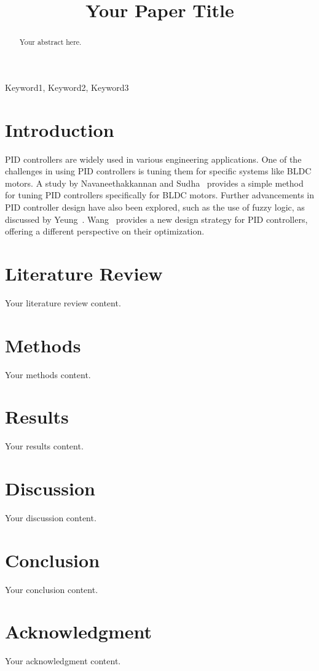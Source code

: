 \documentclass[conference]{IEEEtran}
\begin{document}
\title{Your Paper Title}

\author{
\and
{}
}

\maketitle

\begin{abstract}
Your abstract here.
\end{abstract}

\begin{IEEEkeywords}
Keyword1, Keyword2, Keyword3
\end{IEEEkeywords}

\section{Introduction}
PID controllers are widely used in various engineering applications. One of the challenges in using PID controllers is tuning them for specific systems like BLDC motors. A study by Navaneethakkannan and Sudha~\cite{navaneethakkannan2013} provides a simple method for tuning PID controllers specifically for BLDC motors. Further advancements in PID controller design have also been explored, such as the use of fuzzy logic, as discussed by Yeung~\cite{yeung2014}. Wang~\cite{wang2012} provides a new design strategy for PID controllers, offering a different perspective on their optimization.

\section{Literature Review}
Your literature review content.

\section{Methods}
Your methods content.

\section{Results}
Your results content.

\section{Discussion}
Your discussion content.

\section{Conclusion}
Your conclusion content.

\section*{Acknowledgment}
Your acknowledgment content.

\printbibliography
\end{document}
